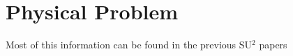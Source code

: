 
\section{Physical Problem}






Most of this information can be found in the previous SU$^2$ papers \cite{Palacios:2014,PalaciosEconomon:2014}